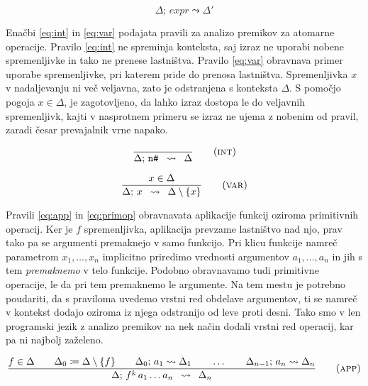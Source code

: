 \begin{equation}
    \Delta; \, expr \leadsto \Delta'
    \label{eq:analiza-premikov-oblika-pravil}
\end{equation}

Enačbi \ref{eq:int} in \ref{eq:var} podajata pravili za analizo premikov za atomarne operacije. Pravilo \ref{eq:int} ne spreminja konteksta, saj izraz ne uporabi nobene spremenljivke in tako ne prenese lastništva. Pravilo \ref{eq:var} obravnava primer uporabe spremenljivke, pri katerem pride do prenosa lastništva. Spremenljivka $x$ v nadaljevanju ni več veljavna, zato je odstranjena s konteksta $\Delta$. S pomočjo pogoja $x \in \Delta$, je zagotovljeno, da lahko izraz dostopa le do veljavnih spremenljivk, kajti v nasprotnem primeru se izraz ne ujema z nobenim od pravil, zaradi česar prevajalnik vrne napako.

\begin{equation}
\infers[int]{}{
    \Delta; \, \texttt{n\#}
}{
    \Delta
}
\label{eq:int}
\end{equation}

\begin{equation}
\infers[var]{
    x \in \Delta
}{
    \Delta; \, x
}{
	\Delta \setminus \{ x \}
}
\label{eq:var}
\end{equation}

Pravili \ref{eq:app} in \ref{eq:primop} obravnavata aplikacije funkcij oziroma primitivnih operacij. Ker je $f$ spremenljivka, aplikacija prevzame lastništvo nad njo, prav tako pa se argumenti premaknejo v samo funkcijo. Pri klicu funkcije namreč parametrom $x_1, \dots, x_n$ implicitno priredimo vrednosti argumentov $a_1, \dots, a_n$ in jih s tem \emph{premaknemo} v telo funkcije. Podobno obravnavamo tudi primitivne operacije, le da pri tem premaknemo le argumente. Na tem mestu je potrebno poudariti, da s praviloma uvedemo vrstni red obdelave argumentov, ti se namreč v kontekst dodajo oziroma iz njega odstranijo od leve proti desni. Tako smo v len programski jezik z analizo premikov na nek način dodali vrstni red operacij, kar pa ni najbolj zaželeno.

\begin{equation}
\infers[app]{
    f \in \Delta \qquad \Delta_0 \coloneqq \Delta \setminus \{ f \} \qquad \Delta_0; \, a_1 \leadsto \Delta_1 \qquad \dots \qquad \Delta_{n-1}; \, a_n \leadsto \Delta_n
}{
    \Delta; \, f^k \, a_1 \dots a_n
}{
	\Delta_n
}
\label{eq:app}
\end{equation}

